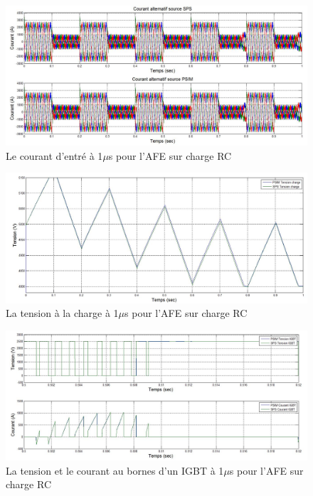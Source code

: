 \begin{figure}[htb]
\centering
\includegraphics[scale=0.5]{fig/coual_afe.jpg}
\caption{Le courant d'entré à 1$\mu$s pour l'AFE sur charge RC}
\label{AF_RC_cou}
\end{figure}




\begin{figure}[htb]
\centering
\includegraphics[scale=0.5]{fig/ten_afe.jpg}
\caption{La tension à la charge à 1$\mu$s pour l'AFE sur charge RC}
\label{AF_RC_ten}
\end{figure}



\begin{figure}[htb]
\centering
\includegraphics[scale=0.5]{fig/com_afe.jpg}
\caption{La tension et le courant au bornes d'un IGBT à 1$\mu$s pour l'AFE sur charge RC}
\label{AF_RC_igbt}
\end{figure}

